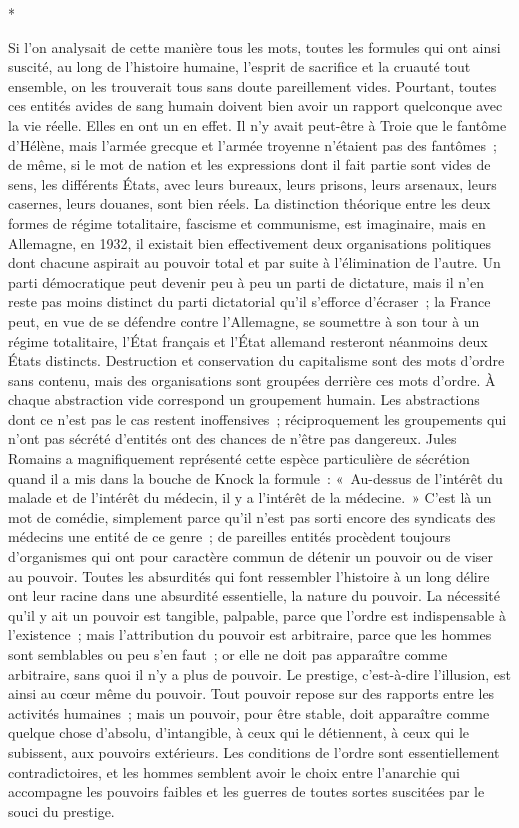\documentclass[french,twoside]{book} %
\begin{document}
\begin{center}
*\end{center}
\noindent Si l'on analysait de cette manière tous les mots, toutes les formules qui ont ainsi suscité, au long de l'histoire humaine, l'esprit de sacrifice et la cruauté tout ensemble, on les trouverait tous sans doute pareillement vides. Pourtant, toutes ces entités avides de sang humain doivent bien avoir un rapport quelconque avec la vie réelle. Elles en ont un en effet. Il n'y avait peut-être à Troie que le fantôme d'Hélène, mais l'armée grecque et l'armée troyenne n'étaient pas des fantômes ; de même, si le mot de nation et les expressions dont il fait partie sont vides de sens, les différents États, avec leurs bureaux, leurs prisons, leurs arsenaux, leurs casernes, leurs douanes, sont bien réels. La distinction théorique entre les deux formes de régime totalitaire, fascisme et communisme, est imaginaire, mais en Allemagne, en 1932, il existait bien effectivement deux organisations politiques dont chacune aspirait au pouvoir total et par suite à l'élimination de l'autre. Un parti démocratique peut devenir peu à peu un parti de dictature, mais il n'en reste pas moins distinct du parti dictatorial qu'il s'efforce d'écraser ; la France peut, en vue de se défendre contre l'Allemagne, se soumettre à son tour à un régime totalitaire, l'État français et l'État allemand resteront néanmoins deux États distincts. Destruc­tion et conservation du capitalisme sont des mots d'ordre sans contenu, mais des organisations sont groupées derrière ces mots d'ordre. À chaque abstrac­tion vide correspond un groupement humain. Les abstractions dont ce n'est pas le cas restent inoffensives ; réciproquement les groupements qui n'ont pas sécrété d'entités ont des chances de n'être pas dangereux. Jules Romains a magnifiquement représenté cette espèce particulière de sécrétion quand il a mis dans la bouche de Knock la formule : « Au-dessus de l'intérêt du malade et de l'intérêt du médecin, il y a l'intérêt de la médecine. » C'est là un mot de comédie, simplement parce qu'il n'est pas sorti encore des syndicats des médecins une entité de ce genre ; de pareilles entités procèdent toujours d'organismes qui ont pour caractère commun de détenir un pouvoir ou de viser au pouvoir. Toutes les absurdités qui font ressembler l'histoire à un long délire ont leur racine dans une absurdité essentielle, la nature du pouvoir. La nécessité qu'il y ait un pouvoir est tangible, palpable, parce que l'ordre est indispensable à l'existence ; mais l'attribution du pouvoir est arbitraire, parce que les hommes sont semblables ou peu s'en faut ; or elle ne doit pas apparaître comme arbitraire, sans quoi il n'y a plus de pouvoir. Le prestige, c'est-à-dire l'illusion, est ainsi au cœur même du pouvoir. Tout pouvoir repose sur des rapports entre les activités humaines ; mais un pouvoir, pour être stable, doit apparaître comme quelque chose d'absolu, d'intangible, à ceux qui le détiennent, à ceux qui le subissent, aux pouvoirs extérieurs. Les conditions de l'ordre sont essentiellement contradictoires, et les hommes semblent avoir le choix entre l'anarchie qui accompagne les pouvoirs faibles et les guerres de toutes sortes suscitées par le souci du prestige.\par
\end{document}
